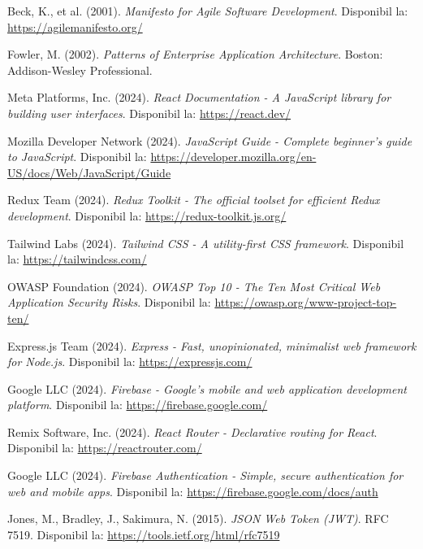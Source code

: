 \documentclass[12pt,a4paper]{report}
\begin{document}

\begin{thebibliography}{20}

Beck, K., et al. (2001). \textit{Manifesto for Agile Software Development}. Disponibil la: \url{https://agilemanifesto.org/}

Fowler, M. (2002). \textit{Patterns of Enterprise Application Architecture}. Boston: Addison-Wesley Professional.

Meta Platforms, Inc. (2024). \textit{React Documentation - A JavaScript library for building user interfaces}. Disponibil la: \url{https://react.dev/}

Mozilla Developer Network (2024). \textit{JavaScript Guide - Complete beginner's guide to JavaScript}. Disponibil la: \url{https://developer.mozilla.org/en-US/docs/Web/JavaScript/Guide}

Redux Team (2024). \textit{Redux Toolkit - The official toolset for efficient Redux development}. Disponibil la: \url{https://redux-toolkit.js.org/}

Tailwind Labs (2024). \textit{Tailwind CSS - A utility-first CSS framework}. Disponibil la: \url{https://tailwindcss.com/}

OWASP Foundation (2024). \textit{OWASP Top 10 - The Ten Most Critical Web Application Security Risks}. Disponibil la: \url{https://owasp.org/www-project-top-ten/}

Express.js Team (2024). \textit{Express - Fast, unopinionated, minimalist web framework for Node.js}. Disponibil la: \url{https://expressjs.com/}

Google LLC (2024). \textit{Firebase - Google's mobile and web application development platform}. Disponibil la: \url{https://firebase.google.com/}

Remix Software, Inc. (2024). \textit{React Router - Declarative routing for React}. Disponibil la: \url{https://reactrouter.com/}

Google LLC (2024). \textit{Firebase Authentication - Simple, secure authentication for web and mobile apps}. Disponibil la: \url{https://firebase.google.com/docs/auth}

Jones, M., Bradley, J., Sakimura, N. (2015). \textit{JSON Web Token (JWT)}. RFC 7519. Disponibil la: \url{https://tools.ietf.org/html/rfc7519}


\end{thebibliography}
\end{document}
